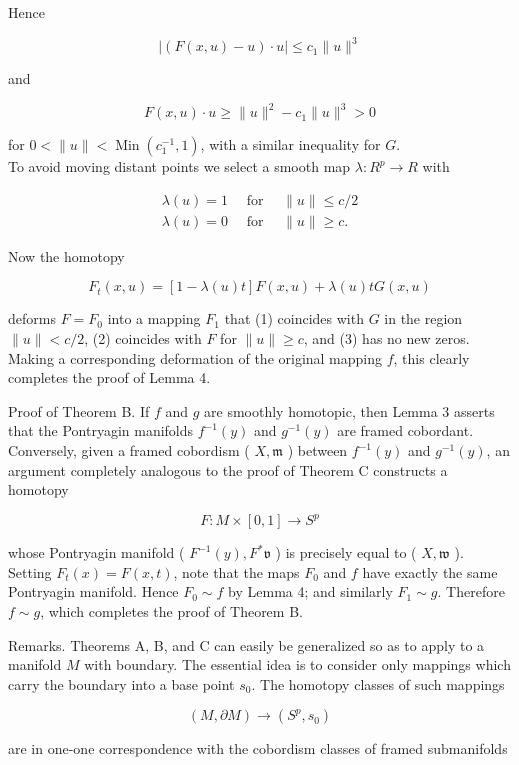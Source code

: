 \documentclass[10pt, letterpaper]{article}
\begin{document}
Hence

$$
|(F(x, u)-u) \cdot u| \leq c_{1}\|u\|^{3}
$$

and

$$
F(x, u) \cdot u \geq\|u\|^{2}-c_{1}\|u\|^{3}>0
$$

for $0<\|u\|<\operatorname{Min}\left(c_{1}^{-1}, 1\right)$, with a similar inequality for $G$.\\
To avoid moving distant points we select a smooth map $\lambda: R^{p} \rightarrow R$ with

$$
\begin{array}{ll}
\lambda(u)=1 \quad \text { for } \quad\|u\| \leq c / 2 \\
\lambda(u)=0 \quad \text { for } \quad\|u\| \geq c .
\end{array}
$$

Now the homotopy

$$
F_{t}(x, u)=[1-\lambda(u) t] F(x, u)+\lambda(u) t G(x, u)
$$

deforms $F=F_{0}$ into a mapping $F_{1}$ that (1) coincides with $G$ in the region $\|u\|<c / 2$, (2) coincides with $F$ for $\|u\| \geq c$, and (3) has no new zeros. Making a corresponding deformation of the original mapping $f$, this clearly completes the proof of Lemma 4.

Proof of Theorem B. If $f$ and $g$ are smoothly homotopic, then Lemma 3 asserts that the Pontryagin manifolds $f^{-1}(y)$ and $g^{-1}(y)$ are framed cobordant. Conversely, given a framed cobordism ( $X, \mathfrak{m}$ ) between $f^{-1}(y)$ and $g^{-1}(y)$, an argument completely analogous to the proof of Theorem C constructs a homotopy

$$
F: M \times[0,1] \rightarrow S^{p}
$$

whose Pontryagin manifold ( $F^{-1}(y), F^{*} \mathfrak{v}$ ) is precisely equal to ( $X, \mathfrak{w}$ ). Setting $F_{t}(x)=F(x, t)$, note that the maps $F_{0}$ and $f$ have exactly the same Pontryagin manifold. Hence $F_{0} \sim f$ by Lemma 4; and similarly $F_{1} \sim g$. Therefore $f \sim g$, which completes the proof of Theorem B.

Remarks. Theorems A, B, and C can easily be generalized so as to apply to a manifold $M$ with boundary. The essential idea is to consider only mappings which carry the boundary into a base point $s_{0}$. The homotopy classes of such mappings

$$
(M, \partial M) \rightarrow\left(S^{p}, s_{0}\right)
$$

are in one-one correspondence with the cobordism classes of framed submanifolds
\end{document}
